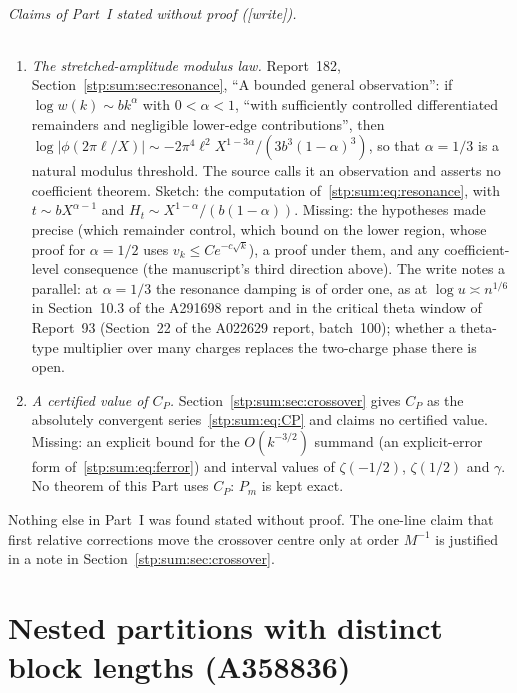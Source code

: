 \documentclass[11pt]{article}
\theoremstyle{remark}\newtheorem{remark}[theorem]{Remark}
\newcommand{\wtag}{\textup{[write]}}
\begin{document}
\paragraph{Claims of Part~I stated without proof (\wtag).}
\begin{enumerate}[label=(\roman*)]
\item \emph{The stretched-amplitude modulus law.} Report~182,
Section~\ref{stp:sum:sec:resonance}, ``A bounded general observation'': if
$\log w(k)\sim bk^\alpha$ with $0<\alpha<1$, ``with sufficiently controlled
differentiated remainders and negligible lower-edge contributions'', then
$\log|\phi(2\pi\ell/X)|\sim-2\pi^4\ell^2X^{1-3\alpha}/(3b^3(1-\alpha)^3)$, so
that $\alpha=1/3$ is a natural modulus threshold. The source calls it an
observation and asserts no coefficient theorem. Sketch: the computation
of~\eqref{stp:sum:eq:resonance}, with $t\sim bX^{\alpha-1}$ and
$H_t\sim X^{1-\alpha}/(b(1-\alpha))$. Missing: the hypotheses made precise
(which remainder control, which bound on the lower region, whose proof for
$\alpha=1/2$ uses $v_k\le Ce^{-c\sqrt k}$), a proof under them, and any
coefficient-level consequence (the manuscript's third direction above).
The write notes a parallel: at $\alpha=1/3$ the resonance damping is of
order one, as at $\log u\asymp n^{1/6}$ in Section~10.3 of the A291698
report and in the critical theta window of Report~93 (Section~22 of the
A022629 report, batch~100); whether a theta-type multiplier over many
charges replaces the two-charge phase there is open.
\item \emph{A certified value of $C_P$.} Section~\ref{stp:sum:sec:crossover}
gives $C_P$ as the absolutely convergent series~\eqref{stp:sum:eq:CP} and
claims no certified value. Missing: an explicit bound for the
$O(k^{-3/2})$ summand (an explicit-error form of~\eqref{stp:sum:eq:ferror})
and interval values of $\zeta(-1/2)$, $\zeta(1/2)$ and $\gamma$. No theorem
of this Part uses $C_P$: $P_m$ is kept exact.
\end{enumerate}
Nothing else in Part~I was found stated without proof. The one-line claim
that first relative corrections move the crossover centre only at order
$M^{-1}$ is justified in a note in Section~\ref{stp:sum:sec:crossover}.


\part{Nested partitions with distinct block lengths (A358836)}\label{stp:len:part}
\end{document}
